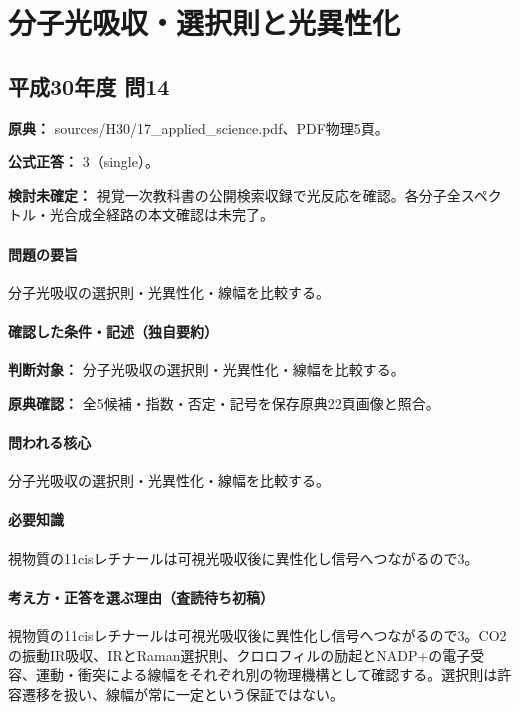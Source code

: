 \section{分子光吸収・選択則と光異性化}

\subsection{平成30年度 問14}
\label{q:h30-reg-applied-14}

\noindent\textbf{原典：} sources/H30/17\_applied\_science.pdf、PDF物理5頁。

\textbf{公式正答：} 3（single）。

\par\textbf{検討未確定：} 視覚一次教科書の公開検索収録で光反応を確認。各分子全スペクトル・光合成全経路の本文確認は未完了。

\paragraph{問題の要旨} 分子光吸収の選択則・光異性化・線幅を比較する。

\paragraph{確認した条件・記述（独自要約）}\mbox{}\par

\noindent\textbf{判断対象：} 分子光吸収の選択則・光異性化・線幅を比較する。\par

\noindent\textbf{原典確認：} 全5候補・指数・否定・記号を保存原典22頁画像と照合。\par

\paragraph{問われる核心} 分子光吸収の選択則・光異性化・線幅を比較する。

\paragraph{必要知識} 視物質の11cisレチナールは可視光吸収後に異性化し信号へつながるので3。

\paragraph{考え方・正答を選ぶ理由（査読待ち初稿）} 視物質の11cisレチナールは可視光吸収後に異性化し信号へつながるので3。CO2の振動IR吸収、IRとRaman選択則、クロロフィルの励起とNADP+の電子受容、運動・衝突による線幅をそれぞれ別の物理機構として確認する。選択則は許容遷移を扱い、線幅が常に一定という保証ではない。

